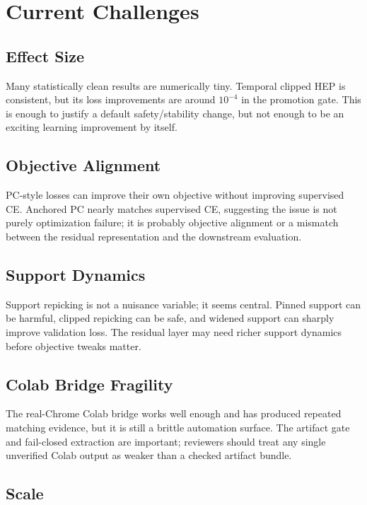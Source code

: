 \documentclass[11pt]{article}
\begin{document}
\section{Current Challenges}

\subsection{Effect Size}

Many statistically clean results are numerically tiny. Temporal clipped HEP is
consistent, but its loss improvements are around $10^{-4}$ in the promotion
gate. This is enough to justify a default safety/stability change, but not
enough to be an exciting learning improvement by itself.

\subsection{Objective Alignment}

PC-style losses can improve their own objective without improving supervised
CE. Anchored PC nearly matches supervised CE, suggesting the issue is not
purely optimization failure; it is probably objective alignment or a mismatch
between the residual representation and the downstream evaluation.

\subsection{Support Dynamics}

Support repicking is not a nuisance variable; it seems central. Pinned support
can be harmful, clipped repicking can be safe, and widened support can sharply
improve validation loss. The residual layer may need richer support dynamics
before objective tweaks matter.

\subsection{Colab Bridge Fragility}

The real-Chrome Colab bridge works well enough and has produced repeated
matching evidence, but it is still a brittle automation surface. The artifact
gate and fail-closed extraction are important; reviewers should treat any
single unverified Colab output as weaker than a checked artifact bundle.

\subsection{Scale}
\end{document}
